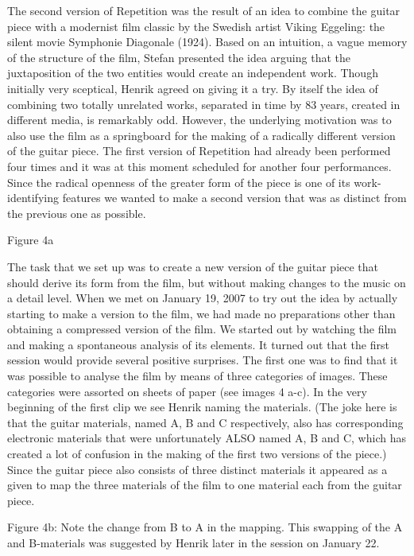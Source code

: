 The second version of Repetition was the result of an idea to combine
the guitar piece with a modernist film classic by the Swedish artist
Viking Eggeling: the silent movie Symphonie Diagonale (1924). Based on
an intuition, a vague memory of the structure of the film, Stefan
presented the idea arguing that the juxtaposition of the two entities
would create an independent work. Though initially very sceptical,
Henrik agreed on giving it a try. By itself the idea of combining two
totally unrelated works, separated in time by 83 years, created in
different media, is remarkably odd. However, the underlying motivation
was to also use the film as a springboard for the making of a
radically different version of the guitar piece. The first version of
Repetition had already been performed four times and it was at this
moment scheduled for another four performances. Since the radical
openness of the greater form of the piece is one of its
work-identifying features we wanted to make a second version that was
as distinct from the previous one as possible.
 
Figure 4a
 

The task that we set up was to create a new version of the guitar
piece that should derive its form from the film, but without making
changes to the music on a detail level. When we met on January 19,
2007 to try out the idea by actually starting to make a version to the
film, we had made no preparations other than obtaining a compressed
version of the film. We started out by watching the film and making a
spontaneous analysis of its elements. It turned out that the first
session would provide several positive surprises. The first one was to
find that it was possible to analyse the film by means of three
categories of images. These categories were assorted on sheets of
paper (see images 4 a-c). In the very beginning of the first clip we
see Henrik naming the materials. (The joke here is that the guitar
materials, named A, B and C respectively, also has corresponding
electronic materials that were unfortunately ALSO named A, B and C,
which has created a lot of confusion in the making of the first two
versions of the piece.) Since the guitar piece also consists of three
distinct materials it appeared as a given to map the three materials
of the film to one material each from the guitar piece.
 
Figure 4b: Note the change from B to A in the mapping. This swapping
of the A and B-materials was suggested by Henrik later in the session
on January 22.
 

